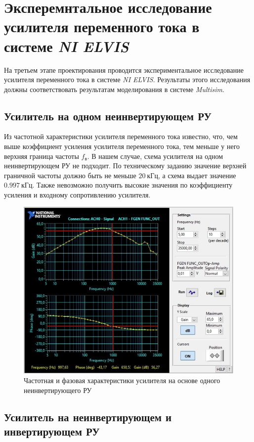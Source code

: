 \section{Эксперемнтальное исследование усилителя переменного тока в системе \textit{NI ELVIS}}

На третьем этапе проектирования 
проводится экспериментальное исследование 
усилителя переменного тока в системе \textit{NI ELVIS}. 
Результаты этого исследования должны 
соответствовать результатам моделирования 
в системе \textit{Multisim}. 

\subsection{Усилитель на одном неинвертирующем РУ}

Из частотной характеристики усилителя переменного тока известно,
что, чем выше коэффициент усиления усилителя переменного тока, 
тем меньше у него верхняя граница частоты $ f_в $. 
В нашем случае, схема усилителя на одном неинвертирующем РУ не подходит.
По техническому заданию значение верхней граничной частоты 
должно быть не меньше $ 20~кГц $, а схема выдает значение $ 0.997~кГц $. 
Также невозможно получить высокие значения 
по коэффициенту усиления и входному сопротивлению усилителя.

\begin{figure}[H]
	\centering
	\includegraphics[width=0.7\linewidth]{photo/elvis_noninv}
	\caption{Частотная и фазовая характеристики усилителя на основе одного неинвертирующего РУ}
	\label{fig:elvis_noninv}
\end{figure}

\subsection{Усилитель на неинвертирующем и инвертирующем РУ}

